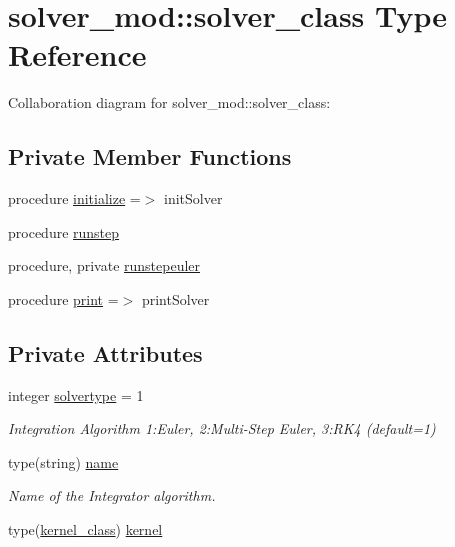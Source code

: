 \hypertarget{structsolver__mod_1_1solver__class}{}\section{solver\+\_\+mod\+:\+:solver\+\_\+class Type Reference}
\label{structsolver__mod_1_1solver__class}


Collaboration diagram for solver\+\_\+mod\+:\+:solver\+\_\+class\+:
\subsection*{Private Member Functions}
\begin{DoxyCompactItemize}
\item 
procedure \mbox{\hyperlink{structsolver__mod_1_1solver__class_a9ac72acd3e4fbb8881c7eaabe9e3d585}{initialize}} =$>$ init\+Solver
\item 
procedure \mbox{\hyperlink{structsolver__mod_1_1solver__class_a54ee0f169b626d3fb484d79cce91c3be}{runstep}}
\item 
procedure, private \mbox{\hyperlink{structsolver__mod_1_1solver__class_a74396adb5f6525ecd691ff70912ee35e}{runstepeuler}}
\item 
procedure \mbox{\hyperlink{structsolver__mod_1_1solver__class_ac61135f89371079744ac9b5fd8da8a41}{print}} =$>$ print\+Solver
\end{DoxyCompactItemize}
\subsection*{Private Attributes}
\begin{DoxyCompactItemize}
\item 
integer \mbox{\hyperlink{structsolver__mod_1_1solver__class_a6bd9eec5b3a11d34981b191b54944ac4}{solvertype}} = 1
\begin{DoxyCompactList}\small\item\em Integration Algorithm 1\+:Euler, 2\+:Multi-\/\+Step Euler, 3\+:R\+K4 (default=1) \end{DoxyCompactList}\item 
type(string) \mbox{\hyperlink{structsolver__mod_1_1solver__class_a0a2677f8e0403b82095b826378f9439d}{name}}
\begin{DoxyCompactList}\small\item\em Name of the Integrator algorithm. \end{DoxyCompactList}\item 
type(\mbox{\hyperlink{structkernel__mod_1_1kernel__class}{kernel\+\_\+class}}) \mbox{\hyperlink{structsolver__mod_1_1solver__class_aa27d4f6ba342d40eaa425a2da8cb19b9}{kernel}}
\end{DoxyCompactItemize}


